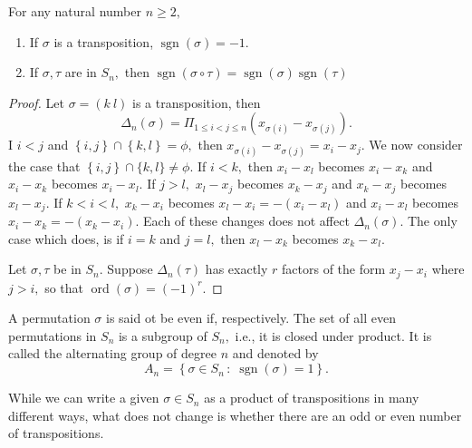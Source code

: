\begin{theorem}
	For any natural number $ n \geq 2,$
	\begin{enumerate}
		\item If $ \sigma$ is a transposition, $ \operatorname{sgn} ( \sigma) = -1.$
		\item If $ \sigma, \tau$ are in $S_n,$ then $ \operatorname{sgn}( \sigma %
			\circ \tau) = \operatorname{sgn}( \sigma) \operatorname{sgn} ( \tau ) $
	\end{enumerate} 
\end{theorem}

\begin{proof}
	Let $ \sigma = (k \ l) $ is a transposition, then
	$$ \Delta_n( \sigma ) = \Pi _{1 \leq i < j \leq n} \left( x _{ \sigma(i) }
	 - x _{ \sigma(j)} \right).$$ 
	 I $i < j$ and $ \left\{ i, j  \right\}  \cap  \left\{ k,l \right\} = \phi,$
	 then $ x _{\sigma(i)} - x _{\sigma(j)} = x_i - x_j. $
	 We now consider the case that $ \left\{ i,j \right\} \cap \{ k, l \} \not = \phi.$
	 If $i < k ,$
	 then $x _i - x_ l $ becomes $x_i - x_k$ and $x_i - x_k$ becomes $x_i - x_l.$
	 If $j > l,$
	 $x_l - x_j$ becomes $x_k - x_j$ and
	 $x_k - x_j$ becomes $x_l - x_j.$
	 If $ k < i < l,$ $x_k - x_i$ becomes $x_l - x_i = -(x_i - x_l) $ 
	 and $ x_i  -x_l$ becomes $x_i - x_k = -(x_k - x_i).$
	Each of these changes does not affect $\Delta_n( \sigma).$
	 The only case which does, is if $i = k $ and $ j = l,$ then $ x_l - x_k$ becomes $x_k - x_l.$

	 Let $\sigma, \tau$ be in $S_n.$ Suppose $ \Delta_n( \tau)$ has exactly $r$ factors
	  of the form $x_j - x_i$ where $j > i,$ so that
	  $\operatorname{ ord} ( \sigma) = (-1) ^r.$ 
\end{proof}


\begin{definition}
	A permutation $ \sigma$ is said ot be even if, respectively.
	The set of all even permutations in $S_n$ is a subgroup of $S_n,$ i.e.,
	it is closed under product. It is called the alternating group of degree $n$
	and denoted by
	$$ A_n = \left\{  \sigma \in S_n \, : \; \operatorname{sgn}( \sigma) = 1 \right\}. $$
\end{definition}


\begin{remark}
	While we can write a given $ \sigma \in S_n$ as a product of transpositions in many different ways,
	what does not change is whether there are an odd or even number of transpositions.
\end{remark}

